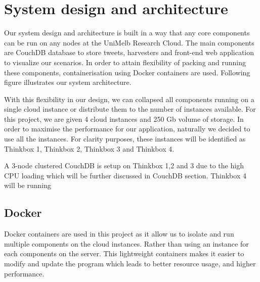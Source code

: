 \section{System design and architecture}



Our system design and architecture is built in a way that any core components can be run on any nodes at the UniMelb Research Cloud. The main components are CouchDB database to store tweets, harvesters and front-end web application to visualize our scenarios. In order to attain flexibility of packing and running these components, containerisation using Docker containers are used. Following figure illustrates our system architecture. 





With this flexibility in our design, we can collapsed all components running on a single cloud instance or distribute them to the number of instances available. For this project, we are given 4 cloud instances and 250 Gb volume of storage. In order to maximise the performance for our application, naturally we decided to use all the instances. For clarity purposes, these instances will be identified as Thinkbox 1, Thinkbox 2, Thinkbox 3 and Thinkbox 4. 

A 3-node clustered CouchDB is setup on Thinkbox 1,2 and 3 due to the high CPU loading which will be further discussed in CouchDB section. Thinkbox 4 will be running 











 
\subsection{Docker}
Docker containers are used in this project as it allow us to isolate and run multiple components on the cloud instances. Rather than using an instance for each components on the server. This lightweight containers makes it easier to modify and update the program which leads to better resource usage, and higher performance. 
